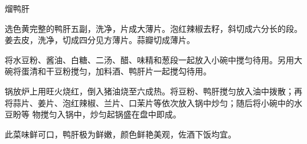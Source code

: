 \begin{recipe}{熘鸭肝}

\ingredients


\preparation

\step 选色黄完整的鸭肝五副，洗净，片成大薄片。泡红辣椒去籽，斜切成六分长的段。
姜去皮，洗净，切成四分见方薄片。蒜瓣切成薄片。

\step 将水豆粉、酱油、白糖、二汤、醋、味精和葱段一起放入小碗中搅匀待用。另用大
碗将蛋清和干豆粉搅匀，加料酒、鸭肝片一起搅勾待用。

\step 锅放炉上用旺火烧红，倒入猪油烧至六成热。将豆粉、鸭肝搅匀放入油中拨散；再
将蒜片、姜片、泡红辣椒、兰片、口茉片等依次放入锅中炒匀；随后将小碗中的水豆盼等
物搅匀入锅中，炒匀起锅盛在盘中即成。

\features

此菜味鲜可口，鸭肝极为鲜嫩，颜色鲜艳美观，佐酒下饭均宜。

\end{recipe}

